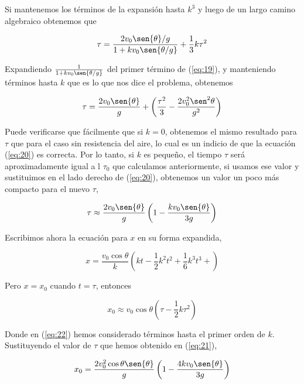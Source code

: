 \documentclass[a4paper,10pt]{article}
\numberwithin{equation}{section}
\begin{document}
Si mantenemos los términos de la expansión hasta $k^3$ y luego de un largo
camino algebraico obtenemos que

\begin{equation}
 \tau = \frac{2 v_0 \sen{\theta} /g}{1+k v_0 \sen{\theta / g}} + \frac{1}{3} k \tau^2
 \label{eq:19}
\end{equation}

Expandiendo $\frac{1}{1+k v_0 \sen{\theta / g}}$ del primer término de
(\ref{eq:19}), y manteniendo términos hasta $k$ que es lo que nos dice
el problema, obtenemos 

\begin{equation}
  \tau = \frac{2 v_0 \sen{\theta}}{g}+\left(\frac{\tau^2}{3} - \frac{2 v_0^2 \sen^2{\theta}}{g^2} \right)
  \label{eq:20}
\end{equation}

Puede verificarse que fácilmente que si $k=0$, obtenemos el mismo resultado
para $\tau$ que para el caso sin resistencia del aire, lo cual es un indicio
de que la ecuación (\ref{eq:20}) es correcta. Por lo tanto, si $k$ es
pequeño, el tiempo $\tau$ será aproximadamente igual a l $\tau_0$ que
calculamos anteriormente, si usamos ese valor y sustituimos en el
lado derecho de (\ref{eq:20}), obtenemos un valor un poco más compacto
para el nuevo $\tau$,

\begin{equation}
 \tau \approx \frac{2 v_0 \sen{\theta}}{g}\left(1 - \frac{k v_0 \sen{\theta}}{3g} \right)
 \label{eq:21}
\end{equation}

Escribimos ahora la ecuación para $x$ en su forma expandida,

\begin{equation}
 x = \frac{v_0 \cos{\theta}}{k}\left(kt - \frac{1}{2}k^2t^2 + \frac{1}{6}k^3t^3  + \right)
\end{equation}

Pero $x = x_0$ cuando $t = \tau$, entonces 

\begin{equation}
 x_0 \approx v_0 \cos{\theta}\left(\tau - \frac{1}{2} k \tau^2 \right)
 \label{eq:22}
\end{equation}

Donde en (\ref{eq:22}) hemos considerado términos hasta el primer orden de $k$. 
Sustituyendo el valor de $\tau$ que hemos obtenido en (\ref{eq:21}), 

\begin{equation}
 x_0 = \frac{2 v_0^2 \cos{\theta} \sen{\theta} }{g}\left(1 - \frac{4k v_0 \sen{\theta} }{3g} \right)
\end{equation}
\end{document}
